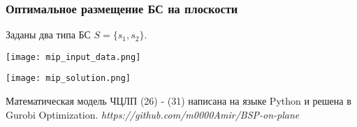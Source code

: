 \begin{frame}
    \frametitle{Оптимальное размещение БС на плоскости}
    \fontsize{10pt}{7.2}\selectfont
    \justifying
    
    Заданы два типа БС $S = \{s_1, s_2\}$.

    \begin{minipage}[c]{0.45\linewidth}
        \fontsize{8pt}{7.2}\selectfont
        \bigskip
        \texttt{[image: mip\_input\_data.png]}
        
    \end{minipage}  
    \begin{minipage}[c]{0.45\linewidth}
        \texttt{[image: mip\_solution.png]}

    \end{minipage}

    \medskip Математическая модель ЧЦЛП (26) - (31) написана на языке Python и решена в Gurobi Optimization.
    \textit{https://github.com/m0000Amir/BSP-on-plane}
    
\end{frame}

